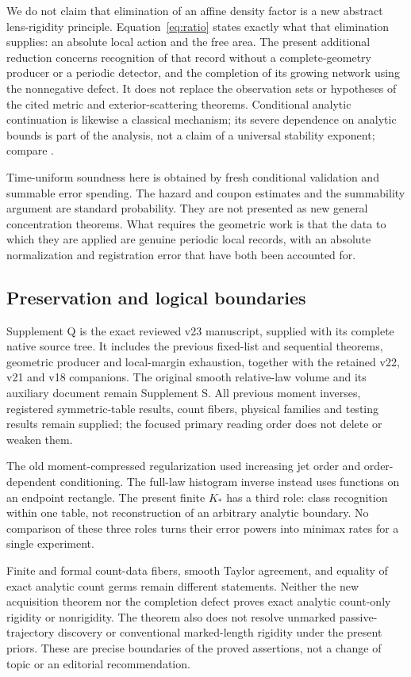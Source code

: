 We do not claim that elimination of an affine density factor is a new
abstract lens-rigidity principle. Equation~\eqref{eq:ratio} states exactly
what that elimination supplies: an absolute local action and the free
area. The present additional reduction concerns recognition of that
record without a complete-geometry producer or a periodic detector,
and the completion of its growing network using the nonnegative defect.
It does not replace the observation sets or hypotheses of the cited
metric and exterior-scattering theorems. Conditional analytic continuation
is likewise a classical mechanism; its severe dependence on analytic
bounds is part of the analysis, not a claim of a universal stability
exponent; compare \cite{Trefethen}.

Time-uniform soundness here is obtained by fresh conditional validation
and summable error spending. The hazard and coupon estimates and the
summability argument are standard probability. They are not presented
as new general concentration theorems. What requires the geometric work
is that the data to which they are applied are genuine periodic local
records, with an absolute normalization and registration error that have
both been accounted for.

\subsection{Preservation and logical boundaries}
Supplement Q is the exact reviewed v23 manuscript, supplied with its
complete native source tree. It includes the previous fixed-list and
sequential theorems, geometric producer and local-margin exhaustion,
together with the retained v22, v21 and v18 companions. The original
smooth relative-law volume and its auxiliary document remain Supplement S.
All previous moment inverses, registered symmetric-table results, count
fibers, physical families and testing results remain supplied; the focused
primary reading order does not delete or weaken them.

The old moment-compressed regularization used increasing jet order and
order-dependent conditioning. The full-law histogram inverse instead
uses functions on an endpoint rectangle. The present finite $K_*$ has a
third role: class recognition within one table, not reconstruction of an
arbitrary analytic boundary. No comparison of these three roles turns
their error powers into minimax rates for a single experiment.

Finite and formal count-data fibers, smooth Taylor agreement, and equality
of exact analytic count germs remain different statements. Neither the
new acquisition theorem nor the completion defect proves exact analytic
count-only rigidity or nonrigidity. The theorem also does not resolve
unmarked passive-trajectory discovery or conventional marked-length
rigidity under the present priors. These are precise boundaries of the
proved assertions, not a change of topic or an editorial recommendation.
